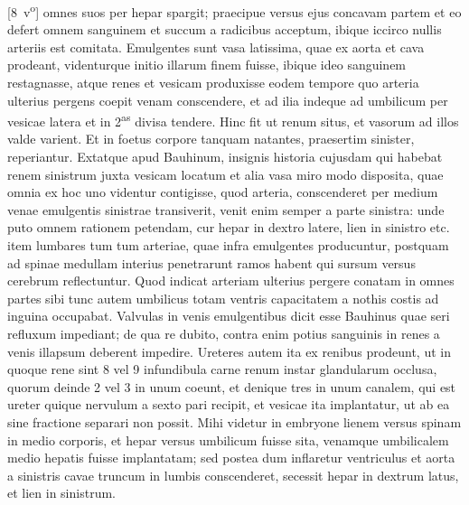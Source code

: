 [8~v\textsuperscript{o}]
omnes suos per hepar spargit; praecipue versus ejus concavam partem et eo defert omnem sanguinem et succum a radicibus acceptum, ibique iccirco nullis arteriis est comitata. 
\pend%
\pstart%
Emulgentes sunt vasa latissima, quae ex aorta et cava prodeant, videnturque initio illarum finem fuisse, ibique ideo sanguinem restagnasse, atque renes et vesicam produxisse eodem tempore quo arteria ulterius pergens coepit venam conscendere, et ad ilia indeque ad umbilicum per vesicae latera et in 2\textsuperscript{as} divisa tendere.
Hinc fit ut renum situs, et vasorum ad illos valde varient. Et in foetus corpore tanquam natantes, praesertim sinister, reperiantur.
%
Extatque apud Bauhinum,\protect{}%
%
 insignis historia cujusdam qui habebat renem sinistrum juxta vesicam locatum et alia vasa miro modo disposita,
quae omnia ex hoc uno videntur contigisse, quod arteria,
conscenderet per medium venae emulgentis sinistrae transiverit, venit enim semper a parte sinistra:
unde puto omnem rationem petendam, cur hepar in dextro latere, lien in sinistro etc.
item lumbares tum
tum arteriae, quae infra emulgentes producuntur, postquam ad spinae medullam interius penetrarunt ramos habent qui sursum versus cerebrum reflectuntur. Quod indicat arteriam ulterius pergere conatam in omnes partes sibi
tunc autem umbilicus totam ventris capacitatem a nothis costis ad inguina occupabat.
Valvulas in venis emulgentibus
%
dicit esse Bauhinus\protect{} %
 quae seri refluxum impediant;
de qua re dubito, contra enim potius sanguinis in renes a venis illapsum deberent impedire.
\pend%
\pstart%
Ureteres autem ita ex renibus prodeunt, ut in quoque rene sint 8 vel 9 infundibula carne renum instar glandularum occlusa, quorum deinde 2 vel 3 in unum coeunt, et denique tres in unum canalem, qui est ureter quique nervulum a sexto pari recipit, et vesicae ita implantatur, ut ab ea sine fractione separari non possit.
\pend%
\pstart%
Mihi videtur in embryone lienem versus spinam in medio corporis, et hepar versus umbilicum fuisse sita, venamque umbilicalem medio hepatis fuisse implantatam; sed postea dum inflaretur ventriculus et aorta a sinistris cavae truncum in lumbis conscenderet, secessit hepar in dextrum latus, et lien in sinistrum.

